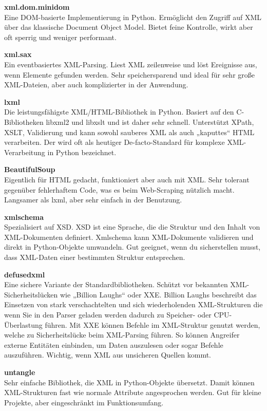 \textbf{xml.dom.minidom}\\
Eine DOM-basierte Implementierung in Python.
Ermöglicht den Zugriff auf XML über das klassische Document Object Model.
Bietet feine Kontrolle, wirkt aber oft sperrig und weniger performant. \cite*{xml.dom.minidom}

\textbf{xml.sax}\\
Ein eventbasiertes XML-Parsing.
Liest XML zeilenweise und löst Ereignisse aus, wenn Elemente gefunden werden.
Sehr speichersparend und ideal für sehr große XML-Dateien, aber auch komplizierter in der Anwendung.\cite*{xml.sax}

\textbf{lxml}\\
Die leistungsfähigste XML/HTML-Bibliothek in Python.
Basiert auf den C-Bibliotheken libxml2 und libxslt und ist daher sehr schnell.
Unterstützt XPath, \ac{XSLT}, Validierung und kann sowohl sauberes XML als auch „kaputtes“ HTML verarbeiten.
Der wird oft als heutiger De-facto-Standard für komplexe XML-Verarbeitung in Python bezeichnet.\cite*{lxml}

\textbf{BeautifulSoup}\\
Eigentlich für HTML gedacht, funktioniert aber auch mit XML. Sehr tolerant gegenüber fehlerhaftem Code, was es beim Web-Scraping nützlich macht.
Langsamer als lxml, aber sehr einfach in der Benutzung. \cite*{BeautifulSoup}

\textbf{xmlschema}\\
Spezialisiert auf \ac{XSD}.
\ac{XSD} ist eine Sprache, die die Struktur und den Inhalt von XML-Dokumenten definiert.
Xmlschema kann XML-Dokumente validieren und direkt in Python-Objekte umwandeln.
Gut geeignet, wenn du sicherstellen musst, dass XML-Daten einer bestimmten Struktur entsprechen. \cite*{xmlschema}

\textbf{defusedxml}\\
Eine sichere Variante der Standardbibliotheken.
Schützt vor bekannten XML-Sicherheitslücken wie „Billion Laughs“ oder \ac{XXE}.
Billion Laughs beschreibt das Einsetzen von stark verschachtelten und sich wiederholenden \ac{XML}-Strukturen die wenn Sie in
den Parser geladen werden dadurch zu Speicher- oder CPU-Überlastung führen.
Mit \ac{XXE} können Befehle im XML-Struktur genutzt werden, welche zu Sicherheitslücke beim XML-Parsing führen.
So können Angreifer externe Entitäten einbinden, um Daten auszulesen oder sogar Befehle auszuführen.
Wichtig, wenn XML aus unsicheren Quellen kommt. \cite*{defusedxml}

\textbf{untangle}\\
Sehr einfache Bibliothek, die XML in Python-Objekte übersetzt.
Damit können XML-Strukturen fast wie normale Attribute angesprochen werden.
Gut für kleine Projekte, aber eingeschränkt im Funktionsumfang. \cite*{untangle}

\pagebreak